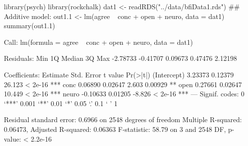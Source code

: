 \begin{Schunk}
\begin{Sinput}
 library(psych)
 library(rockchalk)
 dat1 <- readRDS("../data/bfiData1.rds")
 ## Additive model:
 out1.1 <- lm(agree ~ conc + open + neuro, data = dat1)
 summary(out1.1)
\end{Sinput}
\begin{Soutput}
Call:
lm(formula = agree ~ conc + open + neuro, data = dat1)

Residuals:
     Min       1Q   Median       3Q      Max 
-2.78733 -0.41707  0.09673  0.47476  2.12198 

Coefficients:
            Estimate Std. Error t value Pr(>|t|)    
(Intercept)  3.23373    0.12379  26.123  < 2e-16 ***
conc         0.06890    0.02647   2.603  0.00929 ** 
open         0.27661    0.02647  10.449  < 2e-16 ***
neuro       -0.10633    0.01205  -8.826  < 2e-16 ***
---
Signif. codes:  0 ‘***’ 0.001 ‘**’ 0.01 ‘*’ 0.05 ‘.’ 0.1 ‘ ’ 1

Residual standard error: 0.6966 on 2548 degrees of freedom
Multiple R-squared:  0.06473,	Adjusted R-squared:  0.06363 
F-statistic: 58.79 on 3 and 2548 DF,  p-value: < 2.2e-16
\end{Soutput}
\end{Schunk}
